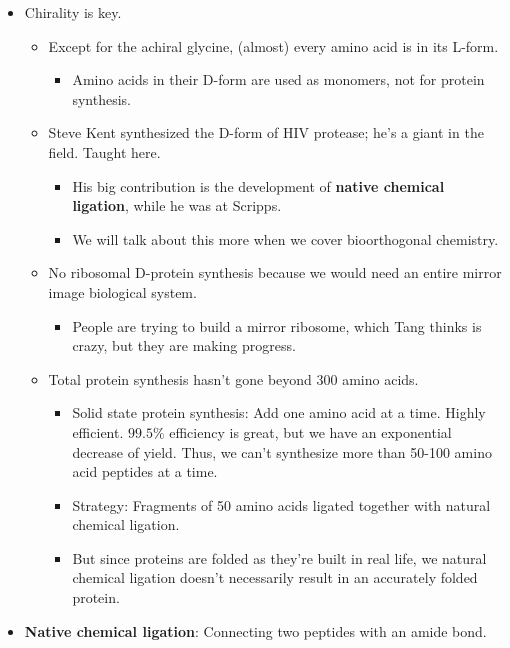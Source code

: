 \documentclass[../notes.tex]{subfiles}
\begin{document}
\begin{itemize}
\begin{itemize}
    \end{itemize}
    \item Chirality is key.
    \begin{itemize}
        \item Except for the achiral glycine, (almost) every amino acid is in its L-form.
        \begin{itemize}
            \item Amino acids in their D-form are used as monomers, not for protein synthesis.
        \end{itemize}
        \item Steve Kent synthesized the D-form of HIV protease; he's a giant in the field. Taught here.
        \begin{itemize}
            \item His big contribution is the development of \textbf{native chemical ligation}, while he was at Scripps.
            \item We will talk about this more when we cover bioorthogonal chemistry.
        \end{itemize}
        \item No ribosomal D-protein synthesis because we would need an entire mirror image biological system.
        \begin{itemize}
            \item People are trying to build a mirror ribosome, which Tang thinks is crazy, but they are making progress.
        \end{itemize}
        \item Total protein synthesis hasn't gone beyond 300 amino acids.
        \begin{itemize}
            \item Solid state protein synthesis: Add one amino acid at a time. Highly efficient. $99.5\%$ efficiency is great, but we have an exponential decrease of yield. Thus, we can't synthesize more than 50-100 amino acid peptides at a time.
            \item Strategy: Fragments of 50 amino acids ligated together with natural chemical ligation.
            \item But since proteins are folded as they're built in real life, we natural chemical ligation doesn't necessarily result in an accurately folded protein.
        \end{itemize}
    \end{itemize}
    \item \textbf{Native chemical ligation}: Connecting two peptides with an amide bond.

\end{itemize}
\end{document}
